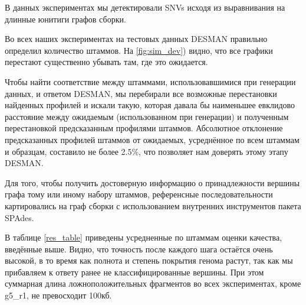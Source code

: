 \documentclass{spbau-diploma}
\begin{document}
В данных экспериментах мы детектировали SNVs исходя из выравнивания на длинные юнитиги графов сборки.

Во всех наших экспериментах на тестовых данных DESMAN правильно определил количество штаммов. На \ref{fig:sim_dev}) видно, что все графики перестают существенно убывать там, где это ожидается.

Чтобы найти соответствие между штаммами, использовавшимися при генерации данных, и ответом DESMAN, мы перебирали все возможные перестановки найденных профилей и искали такую, которая давала бы наименьшее евклидово расстояние между ожидаемым (использованном при генерации) и полученным перестановкой предсказанным профилями штаммов. Абсолютное отклонение предсказанных профилей штаммов от ожидаемых, усреднённое по всем штаммам и образцам, составило не более 2.5\%, что позволяет нам доверять этому этапу DESMAN.

Для того, чтобы получить достоверную информацию о принадлежности вершины графа тому или иному набору штаммов, референсные последовательности картировались на граф сборки с использованием внутренних инструментов пакета SPAdes. 

В таблице \ref{res_table} приведены усредненные по штаммам оценки качества, введённые выше. Видно, что точность после каждого шага остаётся очень высокой, в то время как полнота и степень покрытия генома растут, так как мы прибавляем к ответу ранее не классифицированные вершины. При этом суммарная длина ложноположительных фрагментов во всех экспериментах, кроме g5\_r1, не превосходит 100кб.
\end{document}
